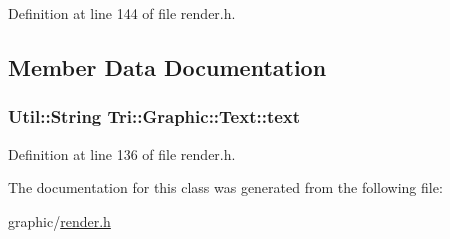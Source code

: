 Definition at line 144 of file render.\+h.



\subsection{Member Data Documentation}
\hypertarget{class_tri_1_1_graphic_1_1_text_ab9700e2f9b6592ffcab3453c95c06152}{}
\subsubsection[{text}]{\setlength{\rightskip}{0pt plus 5cm}Util\+::\+String Tri\+::\+Graphic\+::\+Text\+::text}\label{class_tri_1_1_graphic_1_1_text_ab9700e2f9b6592ffcab3453c95c06152}


Definition at line 136 of file render.\+h.



The documentation for this class was generated from the following file\+:\begin{DoxyCompactItemize}
\item 
graphic/\hyperlink{render_8h}{render.\+h}\end{DoxyCompactItemize}
